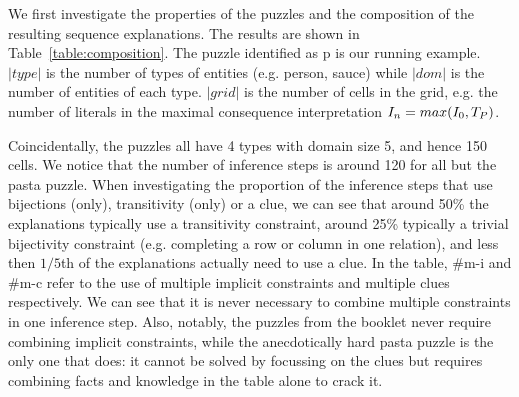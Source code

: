 We first investigate the properties of the puzzles and the composition of the resulting sequence explanations. The results are shown in Table~\ref{table:composition}. The puzzle identified as p is our running example. $|type|$ is the number of types of entities (e.g. person, sauce) while $|dom|$ is the number of entities of each type. $|grid|$ is the number of cells in the grid, e.g. the number of literals in the maximal consequence interpretation $I_n=max(I_0,T_P)$.


Coincidentally, the puzzles all have 4 types with domain size 5, and hence 150 cells. We notice that the number of inference steps is around 120 for all but the pasta puzzle. When investigating the proportion of the inference steps that use bijections (only), transitivity (only) or a clue, we can see that around 50\% the explanations typically use a transitivity constraint, around 25\% typically a trivial bijectivity constraint (e.g. completing a row or column in one relation), and less then $1/5$th of the explanations actually need to use a clue.
In the table, \#m-i and \#m-c refer to the use of multiple implicit constraints and multiple clues respectively. We can see that it is never necessary to combine multiple constraints in one inference step. Also, notably, the puzzles from the booklet never require combining implicit constraints, while the anecdotically hard pasta puzzle is the only one that does: it cannot be solved by focussing on the clues but requires combining facts and knowledge in the table alone to crack it.

